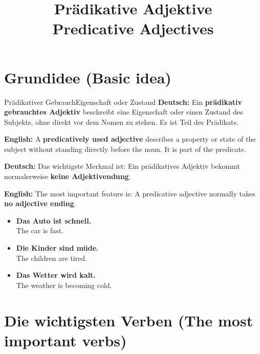 \documentclass[a4paper,11pt]{article}
\title{Prädikative Adjektive\\\large\textnormal{Predicative Adjectives}}
\date{}
\newcommand{\GermanText}[1]{\textbf{Deutsch: }#1\par}
\newcommand{\EnglishText}[1]{{\small\color{SoftGray}\textbf{English: }#1\par}}
\newcommand{\ExampleItem}[2]{\item \textbf{#1}\\{\small\color{SoftGray}#2}}
\begin{document}
    \maketitle
    \tableofcontents
    \newpage

    \section{Grundidee \textnormal{(Basic idea)}}

        \begin{grammarentry}{Prädikativer Gebrauch}{Eigenschaft oder Zustand}
            \GermanText{Ein \textbf{prädikativ gebrauchtes Adjektiv} beschreibt eine Eigenschaft oder einen Zustand des Subjekts, ohne direkt vor dem Nomen zu stehen. Es ist Teil des Prädikats.}
            \EnglishText{A \textbf{predicatively used adjective} describes a property or state of the subject without standing directly before the noun. It is part of the predicate.}

            \GermanText{Das wichtigste Merkmal ist: Ein prädikatives Adjektiv bekommt normalerweise \textbf{keine Adjektivendung}.}
            \EnglishText{The most important feature is: A predicative adjective normally takes \textbf{no adjective ending}.}
        \end{grammarentry}

        \begin{exbox}
            \begin{itemize}
                \ExampleItem{Das Auto ist schnell.}{The car is fast.}
                \ExampleItem{Die Kinder sind müde.}{The children are tired.}
                \ExampleItem{Das Wetter wird kalt.}{The weather is becoming cold.}
            \end{itemize}
        \end{exbox}

    \section{Die wichtigsten Verben \textnormal{(The most important verbs)}}
\end{document}

